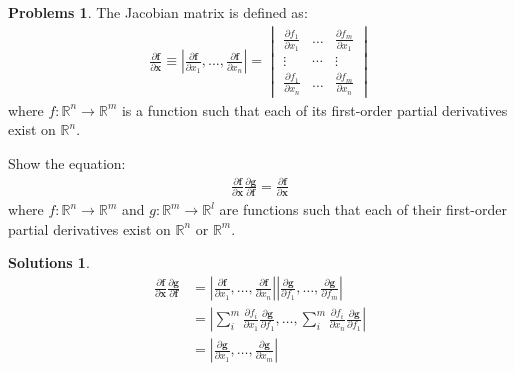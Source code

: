 \documentclass[draft]{article}
\theoremstyle{definition}
\newtheorem{problem}{Problems}[section]
\newtheorem{solution}{Solutions}[section]
\newcommand{\pardif}[2]{\frac{\partial #1}{\partial #2}}
\begin{document}
\begin{problem}
    The Jacobian matrix is defined as:
    \begin{align}
        \pardif{\bm{f}}{\bm{x}}\equiv\left|\pardif{\bm{f}}{x_1},\ldots, \pardif{\bm{f}}{x_n}\right|
        =
        \begin{vmatrix}
            \pardif{f_1}{x_1}&\ldots&\pardif{f_m}{x_1} \\
            \vdots&\cdots&\vdots \\
            \pardif{f_1}{x_n}&\ldots&\pardif{f_m}{x_n}
        \end{vmatrix}
    \end{align}
    where $f: \mathbb{R}^n \to \mathbb{R}^m$ is a function such that each of its first-order partial derivatives exist on $\mathbb{R}^n$. 
    
    Show the equation:
    \begin{align}
        \pardif{\bm{f}}{\bm{x}}\pardif{\bm{g}}{\bm{f}} = \pardif{\bm{f}}{\bm{x}}
    \end{align}
    where $f: \mathbb{R}^n \to \mathbb{R}^m$ and $g: \mathbb{R}^m \to \mathbb{R}^l$ are functions such that each of their first-order partial derivatives exist on $\mathbb{R}^n$ or $\mathbb{R}^m$. 
\end{problem}
\begin{solution}
    \begin{align}
        \pardif{\bm{f}}{\bm{x}}\pardif{\bm{g}}{\bm{f}}&=\left|\pardif{\bm{f}}{x_1},\ldots,\pardif{\bm{f}}{x_n}\right|\left|\pardif{\bm{g}}{f_1},\ldots,\pardif{\bm{g}}{f_m}\right| \\
        &=\left|\sum_i^m\pardif{f_i}{x_1}\pardif{\bm{g}}{f_1}, \ldots, \sum_i^m\pardif{f_i}{x_n}\pardif{\bm{g}}{f_1}\right| \\
        &=\left|\pardif{\bm{g}}{x_1},\ldots,\pardif{\bm{g}}{x_m}\right| \\
    \end{align}
\end{solution}
\end{document}
